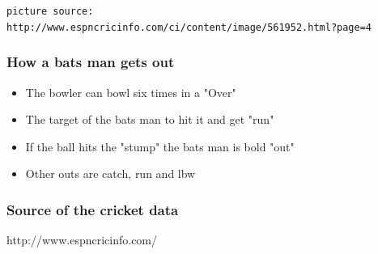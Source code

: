 \documentclass{beamer}
\begin{document}
\begin{frame}
\begin{columns}
		\begin{column}{0.5\textwidth}
			 \begin{center}  \end{center}
		\end{column}
		
	\end{columns} 
	
\texttt {\tiny picture source: http://www.espncricinfo.com/ci/content/image/561952.html?page=4}	
	
\end{frame}


\begin{frame}
  \frametitle{How a bats man gets out}
  
		  \begin{itemize}
			  \item The bowler can bowl six times in a "Over"
			  \item The target of the bats man to hit it and get "run"
			  \item If the ball hits the "stump" the bats man is bold "out"
			  \item Other outs are catch, run and lbw
		  \end{itemize}		
\end{frame}


\begin{frame}
  \frametitle{Source of the cricket data}
  
http://www.espncricinfo.com/	

\end{frame}
\end{document}
